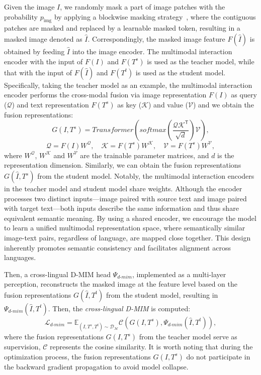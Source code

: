 \documentclass[10pt,journal,compsoc]{IEEEtran}
\begin{document}
Given the image \(I\), we randomly mask a part of image patches with the probability \(p_{\text{img}}\) by applying a blockwise masking strategy~\cite{bao2021beit}, where the contiguous patches are masked and replaced by a learnable masked token, resulting in a masked image denoted as \(\hat{I}\). Correspondingly, the masked image feature \(F(\hat{I})\) is obtained by feeding \(\hat{I}\) into the image encoder. The multimodal interaction encoder with the input of \(F(I)\) and \(F(T^s)\) is used as the teacher model, while that with the input of \(F(\hat{I})\) and \(F(T^t)\) is used as the student model. 
Specifically, taking the teacher model as an example, the multimodal interaction encoder performs the cross-modal fusion via image representation \(F(I)\) as query ($\mathcal{Q}$) and text representation \(F(T^s)\) as key ($\mathcal{K}$) and value ($\mathcal{V}$) and we obtain the fusion representations:
\begin{equation}
G(I, T^{s}) = Transformer(softmax(\frac{\mathcal{Q}\mathcal{K}^{\mathsf{T}}}{\sqrt{d}})\mathcal{V}),
\end{equation}
\begin{equation}
\mathcal{Q} = F(I)W^{\mathcal{Q}}, \quad \mathcal{K} = F(T^s)W^{\mathcal{K}}, \quad \mathcal{V} = F(T^s)W^{\mathcal{V}},
\end{equation}
where $W^{\mathcal{Q}}$, $W^{\mathcal{K}}$ and $W^{\mathcal{V}}$ are the trainable parameter matrices, and $d$ is the representation dimension.
Similarly, we can obtain the fusion representations $G(\hat{I}, T^{s})$ from the student model.
Notably, the multimodal interaction encoders in the teacher model and student model share weights.
Although the encoder processes two distinct inputs—image paired with source text and image paired with target text—both inputs describe the same information and thus share equivalent semantic meaning. By using a shared encoder, we encourage the model to learn a unified multimodal representation space, where semantically similar image-text pairs, regardless of language, are mapped close together. This design inherently promotes semantic consistency and facilitates alignment across languages.

Then, a cross-lingual D-MIM head \(\Psi_{d\text{-}mim}\), implemented as a multi-layer perception, reconstructs the masked image at the feature level based on the fusion representations \(G(\hat{I}, T^t)\) from the student model, resulting in \(\Psi_{d\text{-}mim}(\hat{I}, T^t)\). Then, the \emph{cross-lingual D-MIM} is computed:
\begin{equation}
\mathcal{L}_{d\text{-}mim} = \mathbb{E}_{(I, T^{s}, T^{t}) \sim \mathcal{D}_\mathcal{M}} \mathcal{C}(G(I, T^{s}), \Psi_{d\text{-}mim}(\hat{I}, T^{t})),
\end{equation}
where the fusion representations \(G(I, T^{s})\) from the teacher model serve as supervision, $\mathcal{C}$ represents the cosine similarity. 
It is worth noting that during the optimization process, the fusion representations \(G(I, T^{s})\) do not participate in the backward gradient propagation to avoid model collapse.
\end{document}
